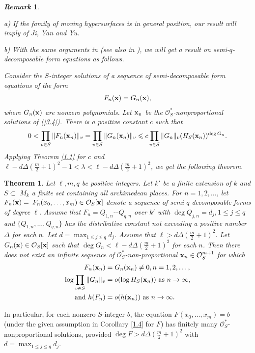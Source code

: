 \documentclass[12pt,leqno]{amsart}
\newtheorem{remark}[equation]{\indent\rm {\it Remark}}
\newtheorem{theorem}[equation]{Theorem}
\numberwithin{equation}{section}
\begin{document}
\begin{remark}\label{3.3}
{\rm
a) If the family of moving hypersurfaces is in general position, our result will imply \cite[Theorem 1.2] {JYY} of  Ji, Yan and Yu.

b) With the same arguments in \cite{JYY} (see also in \cite{GR}), we will get a result on semi-$q$-decomposable form equations as follows.

Consider the $S$-integer solutions of a sequence of semi-decomposable form equations of the form
\begin{align}\label{3.4}
F_{n}({\bf x})=G_{n}({\bf x}),
\end{align}
where $G_{n}({\bf x})$ are nonzero polynomials.
Let ${\bf x}_{n}$ be the $\mathcal{O}_{S}^{*}$-nonproportional solutions of (\ref{3.4}). There is a positive constant $c$ such that
$$0<\prod_{v \in S}\|F_{n}({\bf x}_{n})\|_{v}=\prod_{v \in S}\|G_{n}({\bf x}_{n})\|_{v} \leqslant c \prod_{v \in S}\|G_{n}\|_{v}(H_{S}({\bf x}_{n}))^{\deg  G_{n}}.$$
Applying Theorem \ref{1.1} for $c$ and $\ell-d\Delta\left(\frac{m}{2}+1\right)^{2}-1<\lambda<\ell-d\Delta(\frac{m}{2}+1)^{2}$, we get the following theorem.}
\end{remark}
\begin{theorem}\label{3.5}
Let $\ell,m,q$ be positive integers. Let $k'$ be a finite extension of $k$ and $S \subset$ $M_{k}$ a finite set containing all archimedean places. For $n=1,2, \ldots$, let $F_{n}({\bf x})=$ $F_{n}(x_{0}, \ldots, x_{m}) \in \mathcal{O}_{S}[{\bf x}]$ denote a sequence of semi-$q$-decomposable forms of degree $\ell$. Assume that $F_{n}=Q_{1, n} \cdots Q_{q, n}$ over $k'$ with $\deg  Q_{j, n}=d_{j}, 1 \leqslant j \leqslant q$ and $\{Q_{1, n}, \ldots, Q_{q, n}\}$ has the distributive constant not exceeding a positive number $\Delta$ for each $n$. Let $d=\max _{1 \leqslant j \leqslant q} d_{j}$. Assume that $\ell>d\Delta\left(\frac{m}{2}+1\right)^{2}$. Let $G_{n}({\bf x}) \in \mathcal{O}_{S}[{\bf x}]$ such that $\deg  G_{n}<\ell-d\Delta\left(\frac{m}{2}+1\right)^{2}$ for each $n$. Then there does not exist an infinite sequence of $\mathcal{O}_{S}^{*}$-non-proportional ${\bf x}_{n} \in \mathcal{O}_{S}^{m+1}$ for which
\begin{align*}
F_{n}({\bf x}_{n})&=G_{n}({\bf x}_{n}) \neq 0, n=1,2, \ldots, \\
\log \prod_{v \in S}\|G_{n}\|_{v}&=o(\log H_{S}({\bf x}_{n}))\text { as } n\rightarrow \infty,\\
\text{and }h(F_{n})&=o(h({\bf x}_{n})) \text { as } n\rightarrow \infty.
\end{align*}
\end{theorem}
In particular, for each nonzero $S$-integer $b$, the equation $F(x_{0}, \ldots, x_{m})=b$ (under the given assumption in Corollary \ref{1.4} for $F$) has finitely many $\mathcal{O}_{S}^{*}$-nonproportional solutions, provided $\deg  F>d\Delta\left(\frac{m}{2}+1\right)^{2}$ with $d=\max _{1 \leqslant j \leqslant q} d_{j}$.
\end{document}

